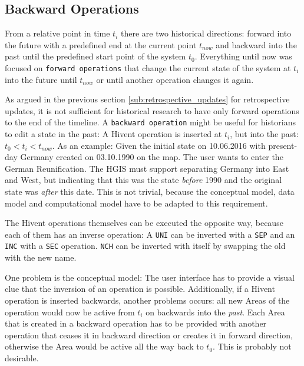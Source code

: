 
\subsection{Backward Operations} %
\label{sub:backward_operations}

From a relative point in time $t_i$ there are two historical directions: forward into the future with a predefined end at the current point $t_{now}$ and backward into the past until the predefined start point of the system $t_0$. Everything until now was focused on \texttt{forward operations} that change the current state of the system at $t_i$ into the future until $t_{now}$ or until another operation changes it again.

As argued in the previous section \ref{sub:retrospective_updates} for retrospective updates, it is not sufficient for historical research to have only forward operations to the end of the timeline.
A \texttt{backward operation} might be useful for historians to edit a state in the past: A Hivent operation is inserted at $t_i$, but into the past: $ t_0 < t_i < t_{now}$. As an example: Given the initial state on 10.06.2016 with present-day Germany created on 03.10.1990 on the map. The user wants to enter the German Reunification. The HGIS must support separating Germany into East and West, but indicating that this was the state \emph{before} 1990 and the original state was \emph{after} this date. This is not trivial, because the conceptual model, data model and computational model have to be adapted to this requirement.

The Hivent operations themselves can be executed the opposite way, because each of them has an inverse operation: A \texttt{UNI} can be inverted with a \texttt{SEP} and an \texttt{INC} with a \texttt{SEC} operation. \texttt{NCH} can be inverted with itself by swapping the old with the new name.

One problem is the conceptual model: The user interface has to provide a visual clue that the inversion of an operation is possible. Additionally, if a Hivent operation is inserted backwards, another problems occurs: all new Areas of the operation would now be active from $t_i$ on backwards into the \emph{past}. Each Area that is created in a backward operation has to be provided with another operation that ceases it in backward direction or creates it in forward direction, otherwise the Area would be active all the way back to $t_0$. This is probably not desirable.



